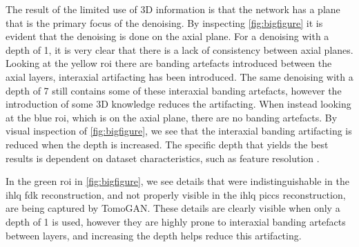 The result of the limited use of 3D information is that the network has a plane that is the primary focus of the denoising. By inspecting \cref{fig:bigfigure} it is evident that the denoising is done on the axial plane. For a denoising with a depth of 1, it is very clear that there is a lack of consistency between axial planes. Looking at the yellow \gls{roi} there are banding artefacts introduced between the axial layers, interaxial artifacting has been introduced. The same denoising with a depth of 7 still contains some of these interaxial banding artefacts, however the introduction of some 3D knowledge reduces the artifacting. When instead looking at the blue \gls{roi}, which is on the axial plane, there are no banding artefacts. By visual inspection of \cref{fig:bigfigure}, we see that the interaxial banding artifacting is reduced when the depth is increased. The specific depth that yields the best results is dependent on dataset characteristics, such as feature resolution \cite{liu2020tomogan}. 

In the green \gls{roi} in \cref{fig:bigfigure}, we see details that were indistinguishable in the \gls{ihlq} \gls{fdk} reconstruction, and not properly visible in the \gls{ihlq} \gls{piccs} reconstruction, are being captured by TomoGAN. These details are clearly visible when only a depth of 1 is used, however they are highly prone to interaxial banding artefacts between layers, and increasing the depth helps reduce this artifacting. 

